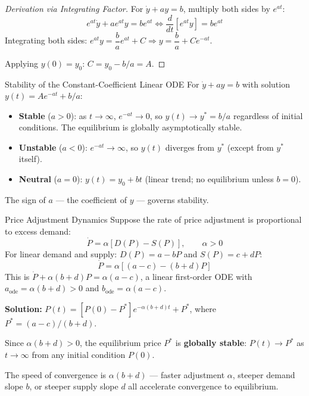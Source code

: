 \documentclass[12pt, a4paper]{article}
\theoremstyle{definition}
\begin{document}
\begin{proof}[Derivation via Integrating Factor]
For $\dot y + ay = b$, multiply both sides by $e^{at}$:
\[
  e^{at}\dot y + ae^{at}y = be^{at}
  \iff \frac{d}{dt}\!\left[e^{at}y\right] = be^{at}
\]
Integrating both sides:
$e^{at}y = \dfrac{b}{a}e^{at} + C \Rightarrow y = \dfrac{b}{a} + Ce^{-at}$.

Applying $y(0)=y_0$: $C = y_0 - b/a = A$.
\end{proof}

\begin{keybox}{Stability of the Constant-Coefficient Linear ODE}
For $\dot y + ay = b$ with solution $y(t) = Ae^{-at} + b/a$:
\begin{itemize}
  \item \textbf{Stable} ($a>0$): as $t\to\infty$, $e^{-at}\to 0$, so
        $y(t)\to y^*=b/a$ regardless of initial conditions. The equilibrium
        is globally asymptotically stable.
  \item \textbf{Unstable} ($a<0$): $e^{-at}\to\infty$, so $y(t)$ diverges
        from $y^*$ (except from $y^*$ itself).
  \item \textbf{Neutral} ($a=0$): $y(t) = y_0 + bt$ (linear trend; no
        equilibrium unless $b=0$).
\end{itemize}
The sign of $a$ --- the coefficient of $y$ --- governs stability.
\end{keybox}

\begin{exbox}{Price Adjustment Dynamics}
Suppose the rate of price adjustment is proportional to excess demand:
\[
  \dot P = \alpha[D(P) - S(P)], \qquad \alpha > 0
\]
For linear demand and supply: $D(P) = a-bP$ and $S(P) = c+dP$:
\[
  \dot P = \alpha[(a-c) - (b+d)P]
\]
This is $\dot P + \alpha(b+d)P = \alpha(a-c)$, a linear first-order ODE with
$a_{\text{ode}} = \alpha(b+d) > 0$ and $b_{\text{ode}} = \alpha(a-c)$.

\textbf{Solution:}
$P(t) = [P(0) - P^*]e^{-\alpha(b+d)t} + P^*$, \quad where $P^* = (a-c)/(b+d)$.

Since $\alpha(b+d)>0$, the equilibrium price $P^*$ is \textbf{globally stable}:
$P(t)\to P^*$ as $t\to\infty$ from any initial condition $P(0)$.

The speed of convergence is $\alpha(b+d)$ --- faster adjustment $\alpha$,
steeper demand slope $b$, or steeper supply slope $d$ all accelerate
convergence to equilibrium.
\end{exbox}
\end{document}
